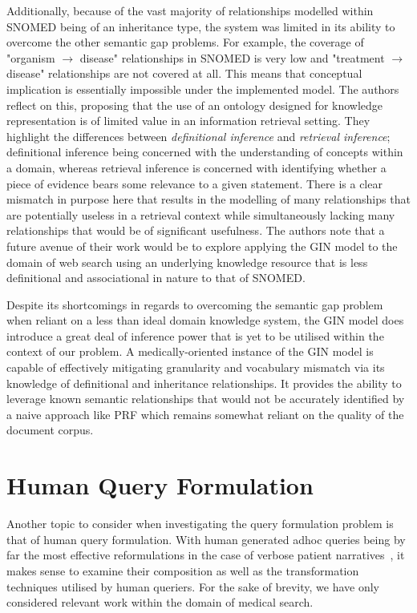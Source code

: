 \documentclass[a4paper]{report}
\begin{document}
Additionally, because of the vast majority of relationships modelled within SNOMED being of an inheritance type, the system was limited in its ability to overcome the other semantic gap problems. For example, the coverage of "organism $\rightarrow$ disease" relationships in SNOMED is very low and "treatment $\rightarrow$ disease" relationships are not covered at all. This means that conceptual implication is essentially impossible under the implemented model. The authors reflect on this, proposing that the use of an ontology designed for knowledge representation is of limited value in an information retrieval setting. They highlight the differences between \textit{definitional inference} and \textit{retrieval inference}; definitional inference being concerned with the understanding of concepts within a domain, whereas retrieval inference is concerned with identifying whether a piece of evidence bears some relevance to a given statement. There is a clear mismatch in purpose here that results in the modelling of many relationships that are potentially useless in a retrieval context while simultaneously lacking many relationships that would be of significant usefulness. The authors note that a future avenue of their work would be to explore applying the GIN model to the domain of web search using an underlying knowledge resource that is less definitional and associational in nature to that of SNOMED. 

Despite its shortcomings in regards to overcoming the semantic gap problem when reliant on a less than ideal domain knowledge system, the GIN model does introduce a great deal of inference power that is yet to be utilised within the context of our problem. A medically-oriented instance of the GIN model is capable of effectively mitigating granularity and vocabulary mismatch via its knowledge of definitional and inheritance relationships. It provides the ability to leverage known semantic relationships that would not be accurately identified by a naive approach like PRF which remains somewhat reliant on the quality of the document corpus. 


\section{Human Query Formulation}

Another topic to consider when investigating the query formulation problem is that of human query formulation. With human generated adhoc queries being by far the most effective reformulations in the case of verbose patient narratives~\cite{koopman2017generating}, it makes sense to examine their composition as well as the transformation techniques utilised by human queriers. For the sake of brevity, we have only considered relevant work within the domain of medical search.
\end{document}
